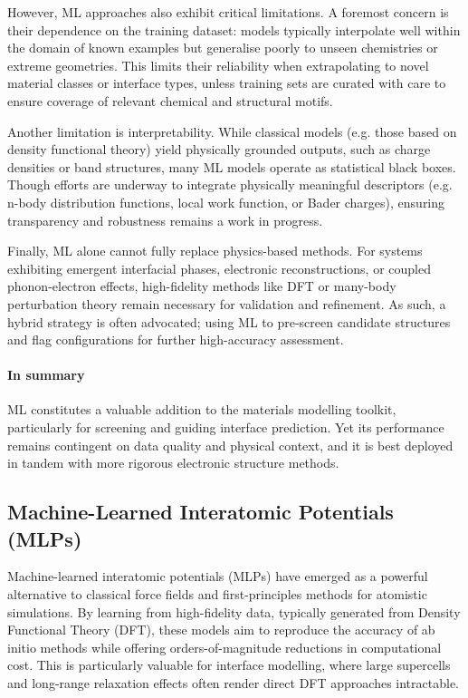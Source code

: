 However, ML approaches also exhibit critical limitations. A foremost concern is their dependence on the training dataset: models typically interpolate well within the domain of known examples but generalise poorly to unseen chemistries or extreme geometries. This limits their reliability when extrapolating to novel material classes or interface types, unless training sets are curated with care to ensure coverage of relevant chemical and structural motifs. 
 
Another limitation is interpretability. While classical models (e.g. those based on density functional theory) yield physically grounded outputs, such as charge densities or band structures, many ML models operate as statistical black boxes. Though efforts are underway to integrate physically meaningful descriptors (e.g. n-body distribution functions, local work function, or Bader charges), ensuring transparency and robustness remains a work in progress. 
 
Finally, ML alone cannot fully replace physics-based methods. For systems exhibiting emergent interfacial phases, electronic reconstructions, or coupled phonon-electron effects, high-fidelity methods like DFT or many-body perturbation theory remain necessary for validation and refinement. As such, a hybrid strategy is often advocated; using ML to pre-screen candidate structures and flag configurations for further high-accuracy assessment. 
 
\paragraph{In summary} ML constitutes a valuable addition to the materials modelling toolkit, particularly for screening and guiding interface prediction. Yet its performance remains contingent on data quality and physical context, and it is best deployed in tandem with more rigorous electronic structure methods. 
 
\subsection{Machine-Learned Interatomic Potentials (MLPs)} 
 
Machine-learned interatomic potentials (MLPs) have emerged as a powerful alternative to classical force fields and first-principles methods for atomistic simulations. By learning from high-fidelity data, typically generated from Density Functional Theory (DFT), these models aim to reproduce the accuracy of ab initio methods while offering orders-of-magnitude reductions in computational cost. This is particularly valuable for interface modelling, where large supercells and long-range relaxation effects often render direct DFT approaches intractable. 
 
